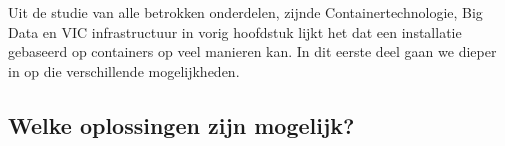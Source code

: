 
\chapter{}%
\label{ch:methodologie}


\lstset{
    language=yaml
    basicstyle=\ttfamily,
    columns=fullflexible,
    frame=single,
    breaklines=true
}

Uit de studie van alle betrokken onderdelen, zijnde Containertechnologie, Big Data en VIC infrastructuur in vorig hoofdstuk lijkt het dat een installatie gebaseerd op containers op veel manieren kan. In dit eerste deel gaan we dieper in op die verschillende mogelijkheden.

\section{Welke oplossingen zijn mogelijk?}

